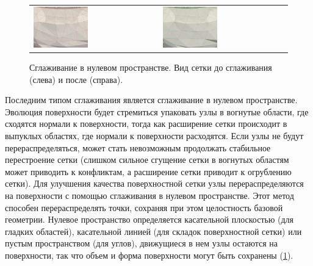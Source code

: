 \begin{figure}[h]
\centering
\begin{tabular}{ll}
\includegraphics[width=0.45\textwidth]{fig/3dr_smooth_before.png}
&
\includegraphics[width=0.45\textwidth]{fig/3dr_smooth_after.png}
\end{tabular}
\singlespacing
{}\caption{Сглаживание в нулевом пространстве. Вид сетки до сглаживания (слева) и после (справа).}
\label{fig:text_1_remesh3_tong_smooth}
\end{figure}

Последним типом сглаживания является сглаживание в нулевом пространстве.
Эволюция поверхности будет стремиться упаковать узлы в вогнутые области, где сходятся нормали к поверхности, тогда как расширение сетки происходит в выпуклых областях, где нормали к поверхности расходятся.
Если узлы не будут перераспределяться, может стать невозможным продолжать стабильное перестроение сетки (слишком сильное сгущение сетки в вогнутых областям может приводить к конфликтам, а расширение сетки приводит к огрублению сетки).
Для улучшения качества поверхностной сетки узлы перераспределяются на поверхности с помощью сглаживания в нулевом пространстве.
Этот метод способен перераспределять точки, сохраняя при этом целостность базовой геометрии.
Нулевое пространство определяется касательной плоскостью (для гладких областей), касательной линией (для складок поверхностной сетки) или пустым пространством (для углов), движущиеся в нем узлы остаются на поверхности, так что объем и форма поверхности могут быть сохранены (\ref{fig:text_1_remesh3_tong_smooth}).

